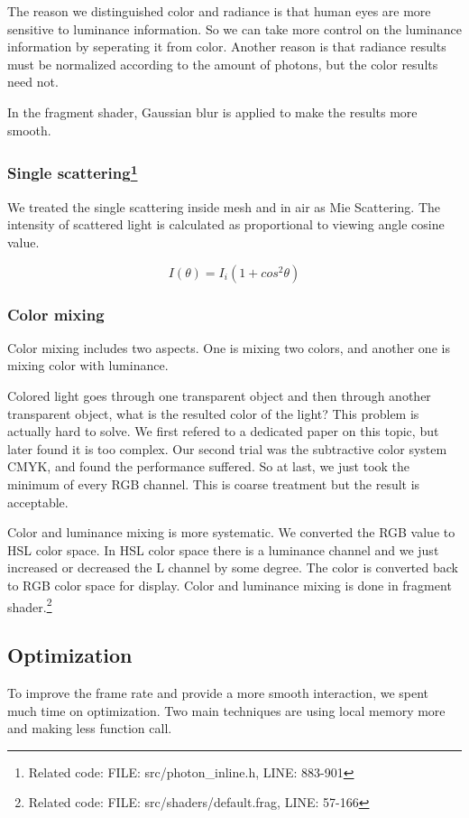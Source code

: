 \documentclass[a4paper]{article}
\begin{document}
\begin{CJK*}{UTF8}{gkai}
The reason we distinguished color and radiance is that human eyes are more sensitive to luminance information. So we can take more control on the luminance information by seperating it from color. Another reason is that radiance results must be normalized according to the amount of photons, but the color results need not.

In the fragment shader, Gaussian blur is applied to make the results more smooth.

\subsubsection[Single scattering]{Single scattering\footnote{Related code: FILE: src/photon\_inline.h, LINE: 883-901}}
We treated the single scattering inside mesh and in air as Mie Scattering. The intensity of scattered light is calculated as proportional to viewing angle cosine value.

$$I(\theta)=I_i(1+cos^2{\theta})$$

\subsubsection{Color mixing}
Color mixing includes two aspects. One is mixing two colors, and another one is mixing color with luminance.

Colored light goes through one transparent object and then through another transparent object, what is the resulted color of the light? This problem is actually hard to solve. We first refered to a dedicated paper on this topic, but later found it is too complex.\cite{citation:color} Our second trial was the subtractive color system CMYK, and found the performance suffered. So at last, we just took the minimum of every RGB channel. This is coarse treatment but the result is acceptable.

Color and luminance mixing is more systematic.  We converted the RGB value to HSL color space. In HSL color space there is a luminance channel and we just increased or decreased the L channel by some degree. The color is converted back to RGB color space for display. Color and luminance mixing is done in fragment shader.\footnote{Related code: FILE: src/shaders/default.frag, LINE: 57-166}



\subsection{Optimization}
To improve the frame rate and provide a more smooth interaction, we spent much time on optimization. Two main techniques are using local memory more and making less function call.


\end{CJK*}
\end{document}
